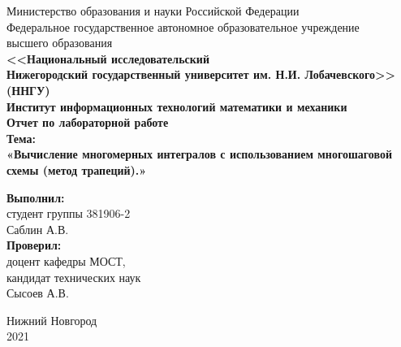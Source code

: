 \documentclass{report}
\begin{document}
\begin{titlepage}

    \begin{center}
    Министерство образования и науки Российской Федерации\\
    Федеральное государственное автономное образовательное учреждение  \\
    высшего образования\\
    \textbf{<<Национальный исследовательский\\Нижегородский государственный университет им. Н.И. Лобачевского>>}\\
    \textbf{(ННГУ)}\\[0.5cm]%
    \textbf{Институт информационных технологий математики и механики}\\[0.5cm]
    \textbf{\large Отчет по лабораторной работе} \\[0.6cm] %
    \textbf{Тема:}\\
    \textbf{\large «Вычисление многомерных интегралов с использованием многошаговой схемы (метод трапеций).»}\\[2.5cm]

    \vspace{4em}

    \begin{flushright}
    \begin{minipage}{0.55\textwidth}
    \begin{flushleft}
        \textbf{Выполнил:} \\
        студент группы 381906-2\\
        Саблин А.В.\\
        \textbf{Проверил:}\\ доцент кафедры МОСТ, \\ кандидат технических наук \\ Сысоев А.В.\\
    \end{flushleft}
    \end{minipage}
    \end{flushright}
    
    \vfill
 
    Нижний Новгород \\ 2021

\end{center}
\end{titlepage}

\setcounter{page}{2}

\tableofcontents
\newpage
\end{document}
